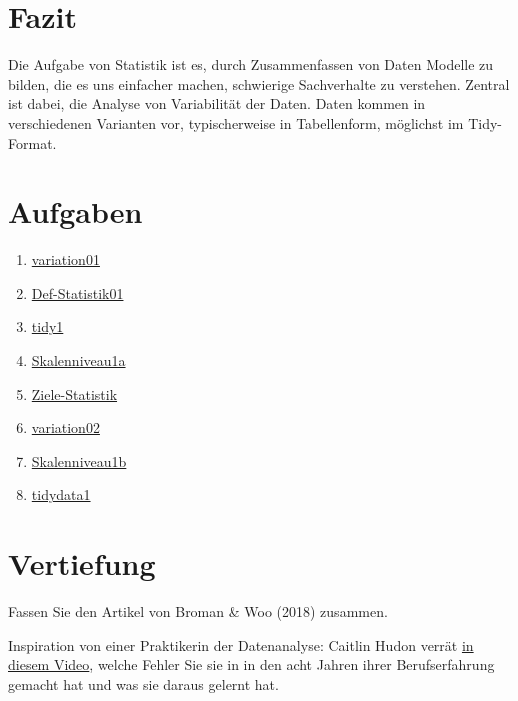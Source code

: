 \documentclass[
  a4paper,
  DIV=11]{scrreprt}
\providecommand{\tightlist}{%
  \setlength{\itemsep}{0pt}\setlength{\parskip}{0pt}}\usepackage{longtable,booktabs,array}
\theoremstyle{definition}
\theoremstyle{definition}
\theoremstyle{definition}
\theoremstyle{remark}
\begin{document}
\section{Fazit}\label{fazit}

Die Aufgabe von Statistik ist es, durch Zusammenfassen von Daten Modelle
zu bilden, die es uns einfacher machen, schwierige Sachverhalte zu
verstehen. Zentral ist dabei, die Analyse von Variabilität der Daten.
Daten kommen in verschiedenen Varianten vor, typischerweise in
Tabellenform, möglichst im Tidy-Format.

\section{Aufgaben}\label{aufgaben}

\begin{enumerate}
\def\labelenumi{\arabic{enumi}.}
\tightlist
\item
  \href{https://datenwerk.netlify.app/posts/variation01/variation01.html}{variation01}
\item
  \href{https://datenwerk.netlify.app/posts/def-statistik01/def-statistik01}{Def-Statistik01}
\item
  \href{https://datenwerk.netlify.app/posts/tidy1/tidy1.html}{tidy1}
\item
  \href{https://datenwerk.netlify.app/posts/skalenniveau1a/skalenniveau1a}{Skalenniveau1a}
\item
  \href{https://datenwerk.netlify.app/posts/ziele-statistik/ziele-statistik}{Ziele-Statistik}
\item
  \href{https://datenwerk.netlify.app/posts/variation02/variation02.html}{variation02}
\item
  \href{https://datenwerk.netlify.app/posts/skalenniveau1b/skalenniveau1b}{Skalenniveau1b}
\item
  \href{https://datenwerk.netlify.app/posts/tidydata1/tidydata1.html}{tidydata1}
\end{enumerate}

\section{Vertiefung}\label{vertiefung}

Fassen Sie den Artikel von Broman \& Woo (2018) zusammen.

Inspiration von einer Praktikerin der Datenanalyse: Caitlin Hudon verrät
\href{https://www.youtube.com/watch?v=O5lP6XcopdQ&list=PL9HYL-VRX0oQchs7dqFICoxMgnvFO10tC&index=15&t=1s}{in
diesem Video}, welche Fehler Sie sie in in den acht Jahren ihrer
Berufserfahrung gemacht hat und was sie daraus gelernt hat.
\end{document}
